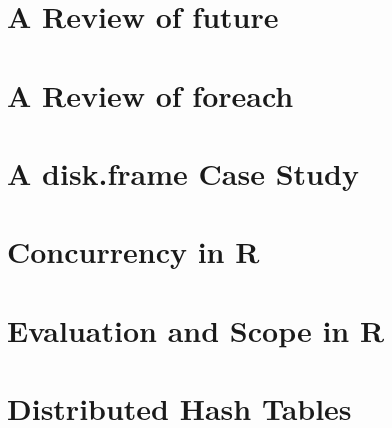 \section{A Review of future}\label{sec:future-detail}

\section{A Review of foreach}\label{sec:review-foreach}

\section{A disk.frame Case Study}\label{sec:disk-frame-study}

\section{Concurrency in R}\label{sec:concurrency-r}

\section{Evaluation and Scope in R}\label{sec:eval-r}

\section{Distributed Hash Tables}\label{sec:dht}

